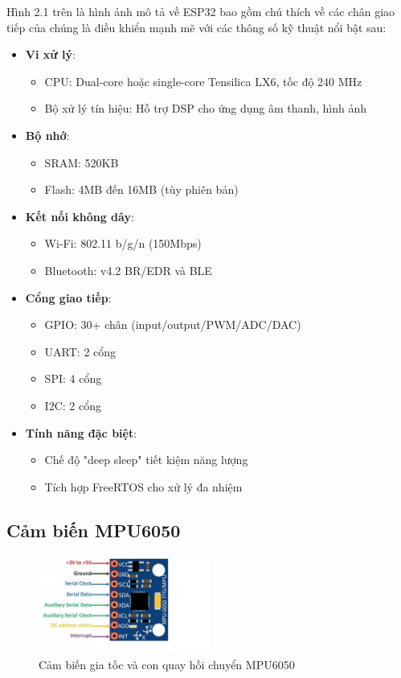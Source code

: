 \documentclass[a4paper,12pt]{report}
\begin{document}
	Hình 2.1 trên là hình ảnh mô tả về ESP32 bao gồm chú thích về các chân giao tiếp của chúng là điều khiển mạnh mẽ với các thông số kỹ thuật nổi bật sau:
	
	\begin{itemize}
		\item \textbf{Vi xử lý}:
		\begin{itemize}
			\item CPU: Dual-core hoặc single-core Tensilica LX6, tốc độ 240 MHz
			\item Bộ xử lý tín hiệu: Hỗ trợ DSP cho ứng dụng âm thanh, hình ảnh
		\end{itemize}
		
		\item \textbf{Bộ nhớ}:
		\begin{itemize}
			\item SRAM: 520KB
			\item Flash: 4MB đến 16MB (tùy phiên bản)
		\end{itemize}
		
		\item \textbf{Kết nối không dây}:
		\begin{itemize}
			\item Wi-Fi: 802.11 b/g/n (150Mbps)
			\item Bluetooth: v4.2 BR/EDR và BLE
		\end{itemize}
		
		\item \textbf{Cổng giao tiếp}:
		\begin{itemize}
			\item GPIO: 30+ chân (input/output/PWM/ADC/DAC)
			\item UART: 2 cổng
			\item SPI: 4 cổng
			\item I2C: 2 cổng
		\end{itemize}
		
		\item \textbf{Tính năng đặc biệt}:
		\begin{itemize}
			\item Chế độ "deep sleep" tiết kiệm năng lượng
			\item Tích hợp FreeRTOS cho xử lý đa nhiệm
		\end{itemize}
	\end{itemize}
	
	
	\subsection{Cảm biến MPU6050}
	\begin{figure}[h]
		\centering
		\includegraphics[width=0.5\textwidth]{MPU6050.png}
		\caption{Cảm biến gia tốc và con quay hồi chuyển MPU6050}
		\label{fig:mpu6050}
	\end{figure}
	
\end{document}
